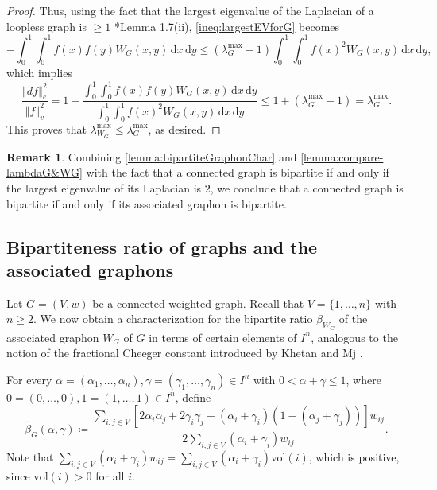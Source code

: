 \documentclass[12pt,a4paper,bold]{thesis}
\theoremstyle{definition}
\newtheorem{remark}[thm]{Remark}
\newcommand*{\norm}[2][]{\left\Vert #2 \right\Vert_{#1}}
\newcommand{\vol}{\ensuremath{\mathrm{vol}}}
\begin{document}
\begin{proof}
    Thus, using the fact that the largest eigenvalue of the Laplacian of  a loopless graph
    is $\geq 1$ \cite{Chung-SpectralGraphTh97}*{Lemma 1.7(ii)}, 
    \eqref{ineq:largestEVforG} becomes
    \begin{equation*}
        - \int_{0}^{1} \int_{0}^{1} f(x) f(y) W_G(x,y)\, \mathrm{d}x\, \mathrm{d}y
        \leq (\lambda_G^{\max} - 1) 
        \int_{0}^{1} \int_{0}^{1} f(x)^2 W_G(x,y)\, \mathrm{d}x\, \mathrm{d}y,
    \end{equation*}
    which implies
    \begin{equation*}
        \frac{\norm[e]{df}^2}{\norm[v]{f}^2}
        = 1 - \frac{\int_{0}^{1} \int_{0}^{1} f(x) f(y) W_G(x,y)\, \mathrm{d}x\, \mathrm{d}y}
        {\int_{0}^{1} \int_{0}^{1} f(x)^2 W_G(x,y)\, \mathrm{d}x\, \mathrm{d}y}
        \leq 1 + (\lambda_G^{\max} - 1)  = \lambda_G^{\max}.
    \end{equation*}
    This proves that $\lambda_{W_G}^{\max} \leq \lambda_G^{\max}$, as desired.
\end{proof}

\begin{remark}
    Combining \cref{lemma:bipartiteGraphonChar} and \cref{lemma:compare-lambdaG&WG} 
    with the fact that a connected graph is bipartite if and only if the largest eigenvalue
    of its Laplacian is $2$, we conclude that a connected graph is bipartite
    if and only if its associated graphon is bipartite.
\end{remark}

\subsection{Bipartiteness ratio of graphs and the associated graphons}

Let $G = (V,w)$ be a connected weighted graph. Recall that $V = \{1, \dots, n\}$
with $n \geq 2$. We now obtain a characterization for the bipartite ratio $\beta_{W_G}$
of the associated graphon $W_G$ of $G$ in terms of certain elements of $I^n$, 
analogous to the notion of the fractional Cheeger constant introduced by 
Khetan and Mj \cite{Abhishek-Mahan24}.

For every $\alpha = (\alpha_1, \dots, \alpha_n), \gamma = (\gamma_1, \dots, \gamma_n)
\in I^n$ with $0 < \alpha + \gamma \leq 1$, where $0 = (0, \dots, 0), 
1 = (1, \dots, 1) \in I^n$, define
\begin{equation*}
    \tilde \beta_G(\alpha,\gamma) \coloneq 
    \frac{\sum_{i,j \in V} [2 \alpha_i \alpha_j + 2 \gamma_i \gamma_j 
    + (\alpha_i + \gamma_i)(1 - (\alpha_j + \gamma_j))] w_{ij}}
    {2 \sum_{i,j \in V} (\alpha_i + \gamma_i) w_{ij}}.
\end{equation*}
Note that $\sum_{i,j \in V} (\alpha_i + \gamma_i) w_{ij} 
= \sum_{i,j \in V} (\alpha_i + \gamma_i) \vol(i)$, which is positive, 
since $\vol(i) > 0$ for all $i$.
\end{document}
